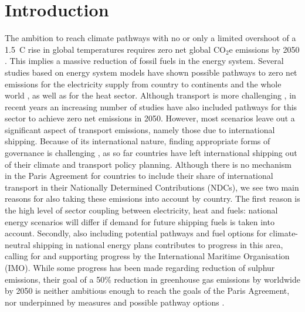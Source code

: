 \documentclass[article]{elsarticle}
\begin{document}

\section{Introduction}
The ambition to reach climate pathways with no or only a limited overshoot of a 1.5~\degree C rise in global temperatures requires zero net global CO$_2$e emissions by 2050 \cite{IPCC2018}. This implies a massive reduction of fossil fuels in the energy system. Several studies based on energy system models have shown possible pathways to zero net emissions for the electricity supply from country to continents and the whole world \cite{Brown2018}, as well as for the heat sector. Although transport is more challenging \cite{Salvucci2018,Schafer2012}, in recent years an increasing number of studies have also included pathways for this sector to achieve zero net emissions in 2050. However, most scenarios leave out a significant aspect of transport emissions, namely those due to international shipping. Because of its international nature, finding appropriate forms of governance is challenging \cite{GRITSENKO2017}, as so far countries have left international shipping out of their climate and transport policy planning. Although there is no mechanism in the Paris Agreement for countries to include their share of international transport in their Nationally Determined Contributions (NDCs), we see two main reasons for also taking these emissions into account by country. The first reason is the high level of sector coupling between electricity, heat and fuels: national energy scenarios will differ if demand for future shipping fuels is taken into account. Secondly, also including potential pathways and fuel options for climate-neutral shipping in national energy plans contributes to progress in this area, calling for and supporting progress by the International Maritime Organisation (IMO). While some progress has been made regarding reduction of sulphur emissions, their goal of a 50\% reduction in greenhouse gas emissions by worldwide by 2050 \cite{IMO2018} is neither ambitious enough to reach the goals of the Paris Agreement, nor underpinned by measures and possible pathway options \cite{Wan2018}.
\end{document}
